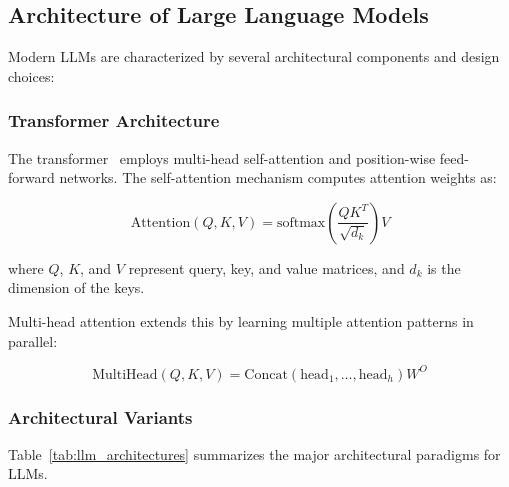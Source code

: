 \subsection{Architecture of Large Language Models}
\label{subsec:llm_architecture}

Modern LLMs are characterized by several architectural components and design choices:

\subsubsection{Transformer Architecture}

The transformer~\cite{vaswani2017attention} employs multi-head self-attention and position-wise feed-forward networks. The self-attention mechanism computes attention weights as:

\begin{equation}
\text{Attention}(Q, K, V) = \text{softmax}\left(\frac{QK^T}{\sqrt{d_k}}\right)V
\end{equation}

where $Q$, $K$, and $V$ represent query, key, and value matrices, and $d_k$ is the dimension of the keys.

Multi-head attention extends this by learning multiple attention patterns in parallel:

\begin{equation}
\text{MultiHead}(Q, K, V) = \text{Concat}(\text{head}_1, \ldots, \text{head}_h)W^O
\end{equation}

\subsubsection{Architectural Variants}

Table~\ref{tab:llm_architectures} summarizes the major architectural paradigms for LLMs.

\begin{table}[htbp]
\centering
\caption{Comparison of LLM Architectural Paradigms}
\label{tab:llm_architectures}
\end{table}

